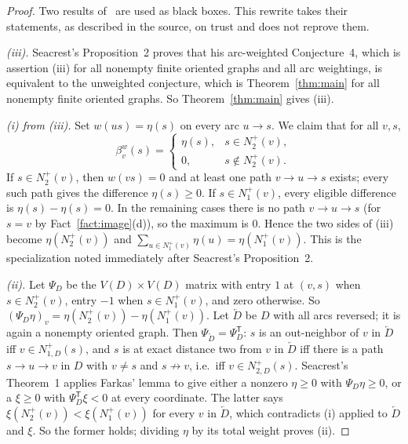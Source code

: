 \documentclass[11pt]{article}
\theoremstyle{remark}
\begin{document}
\begin{proof}
Two results of~\cite{Seacrest2015} are used as black boxes. This rewrite
takes their statements, as described in the source, on trust and does not
reprove them.

\emph{\textup{(iii)}.} Seacrest's Proposition~2 proves that his arc-weighted
Conjecture~4, which is assertion \textup{(iii)} for all nonempty finite
oriented graphs and all arc weightings, is equivalent to the unweighted
conjecture, which is Theorem~\ref{thm:main} for all nonempty finite oriented
graphs. So Theorem~\ref{thm:main} gives \textup{(iii)}.

\emph{\textup{(i)} from \textup{(iii)}.} Set $w(us)=\eta(s)$ on every arc
$u\to s$. We claim that for all $v,s$,
\[
 \beta_v^w(s)=
 \begin{cases}
  \eta(s),&s\in N_2^+(v),\\
  0,&s\notin N_2^+(v).
 \end{cases}
\]
If $s\in N_2^+(v)$, then $w(vs)=0$ and at least one path $v\to u\to s$
exists; every such path gives the difference $\eta(s)\ge0$. If
$s\in N_1^+(v)$, every eligible difference is $\eta(s)-\eta(s)=0$. In the
remaining cases there is no path $v\to u\to s$ (for $s=v$ by
Fact~\ref{fact:image}(d)), so the maximum is $0$. Hence the two sides of
\textup{(iii)} become $\eta(N_2^+(v))$ and
$\sum_{u\in N_1^+(v)}\eta(u)=\eta(N_1^+(v))$. This is the specialization
noted immediately after Seacrest's Proposition~2.

\emph{\textup{(ii)}.} Let $\Psi_D$ be the $V(D)\times V(D)$ matrix with
entry $1$ at $(v,s)$ when $s\in N_2^+(v)$, entry $-1$ when $s\in N_1^+(v)$,
and zero otherwise. So $(\Psi_D\eta)_v=\eta(N_2^+(v))-\eta(N_1^+(v))$. Let
$\overleftarrow D$ be $D$ with all arcs reversed; it is again a nonempty
oriented graph. Then $\Psi_{\overleftarrow D}=\Psi_D^{\mathsf T}$: $s$ is an
out-neighbor of $v$ in $\overleftarrow D$ iff $v\in N_{1,D}^+(s)$, and $s$ is
at exact distance two from $v$ in $\overleftarrow D$ iff there is a path
$s\to u\to v$ in $D$ with $v\ne s$ and $s\not\to v$, i.e.\ iff
$v\in N_{2,D}^+(s)$. Seacrest's Theorem~1 applies Farkas' lemma to give
either a nonzero $\eta\ge0$ with $\Psi_D\eta\ge0$, or a $\xi\ge0$ with
$\Psi_D^{\mathsf T}\xi<0$ at every coordinate. The latter says
$\xi(N_2^+(v))<\xi(N_1^+(v))$ for every $v$ in $\overleftarrow D$, which
contradicts \textup{(i)} applied to $\overleftarrow D$ and $\xi$. So the
former holds; dividing $\eta$ by its total weight proves \textup{(ii)}.
\end{proof}
\end{document}
